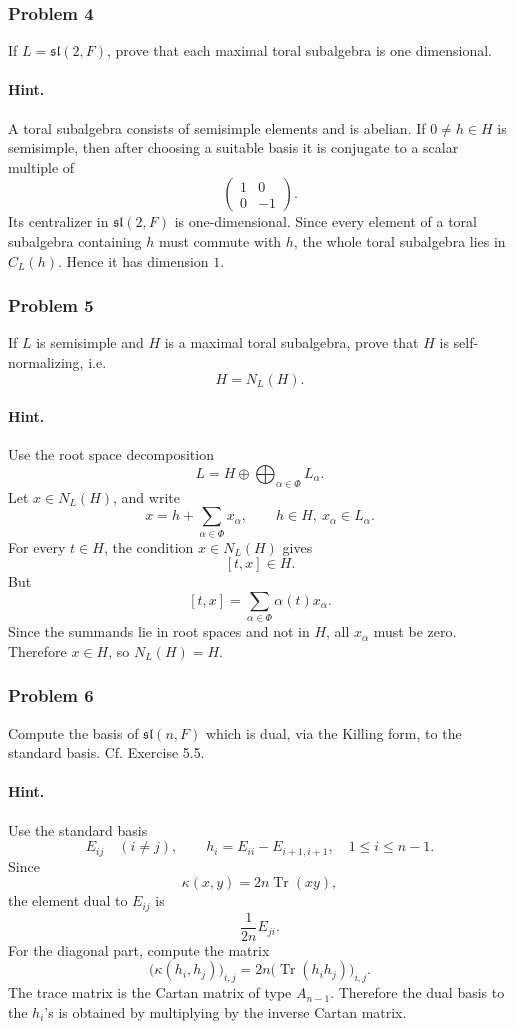\documentclass[12pt, a4paper]{article}
\begin{document}
\subsubsection{Problem 4}

If \(L=\mathfrak{sl}(2,F)\), prove that each maximal toral subalgebra is one
dimensional.

\paragraph{Hint.}
A toral subalgebra consists of semisimple elements and is abelian. If
\(0\neq h\in H\) is semisimple, then after choosing a suitable basis it is
conjugate to a scalar multiple of
\[
\begin{pmatrix}
1&0\\
0&-1
\end{pmatrix}.
\]
Its centralizer in \(\mathfrak{sl}(2,F)\) is one-dimensional. Since every
element of a toral subalgebra containing \(h\) must commute with \(h\), the
whole toral subalgebra lies in \(C_L(h)\). Hence it has dimension \(1\).

\subsubsection{Problem 5}

If \(L\) is semisimple and \(H\) is a maximal toral subalgebra, prove that \(H\)
is self-normalizing, i.e.
\[
H=N_L(H).
\]

\paragraph{Hint.}
Use the root space decomposition
\[
L=H\oplus \bigoplus_{\alpha\in \Phi} L_\alpha.
\]
Let \(x\in N_L(H)\), and write
\[
x=h+\sum_{\alpha\in\Phi}x_\alpha,
\qquad h\in H,\ x_\alpha\in L_\alpha.
\]
For every \(t\in H\), the condition \(x\in N_L(H)\) gives
\[
[t,x]\in H.
\]
But
\[
[t,x]=\sum_{\alpha\in\Phi}\alpha(t)x_\alpha.
\]
Since the summands lie in root spaces and not in \(H\), all \(x_\alpha\) must
be zero. Therefore \(x\in H\), so \(N_L(H)=H\).

\subsubsection{Problem 6}

Compute the basis of \(\mathfrak{sl}(n,F)\) which is dual, via the Killing
form, to the standard basis. Cf. Exercise 5.5.

\paragraph{Hint.}
Use the standard basis
\[
E_{ij}\quad (i\neq j),\qquad
h_i=E_{ii}-E_{i+1,i+1},\quad 1\leq i\leq n-1.
\]
Since
\[
\kappa(x,y)=2n\operatorname{Tr}(xy),
\]
the element dual to \(E_{ij}\) is
\[
\frac{1}{2n}E_{ji}.
\]
For the diagonal part, compute the matrix
\[
\bigl(\kappa(h_i,h_j)\bigr)_{i,j}
=
2n\bigl(\operatorname{Tr}(h_i h_j)\bigr)_{i,j}.
\]
The trace matrix is the Cartan matrix of type \(A_{n-1}\). Therefore the dual
basis to the \(h_i\)'s is obtained by multiplying by the inverse Cartan matrix.
\end{document}
